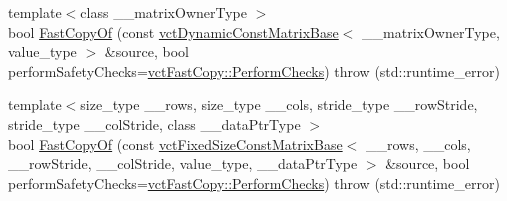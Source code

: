 {\bf }\par
\begin{DoxyCompactItemize}
\item 
{\footnotesize template$<$class \+\_\+\+\_\+matrix\+Owner\+Type $>$ }\\bool \hyperlink{classvct_dynamic_matrix_base_ad8fc2fec875cccff85761db606bd723b}{Fast\+Copy\+Of} (const \hyperlink{classvct_dynamic_const_matrix_base}{vct\+Dynamic\+Const\+Matrix\+Base}$<$ \+\_\+\+\_\+matrix\+Owner\+Type, value\+\_\+type $>$ \&source, bool perform\+Safety\+Checks=\hyperlink{classvct_fast_copy_af2981ae09904d1a4dd9b2d19c86c6cd9}{vct\+Fast\+Copy\+::\+Perform\+Checks})  throw (std\+::runtime\+\_\+error)
\item 
{\footnotesize template$<$size\+\_\+type \+\_\+\+\_\+rows, size\+\_\+type \+\_\+\+\_\+cols, stride\+\_\+type \+\_\+\+\_\+row\+Stride, stride\+\_\+type \+\_\+\+\_\+col\+Stride, class \+\_\+\+\_\+data\+Ptr\+Type $>$ }\\bool \hyperlink{classvct_dynamic_matrix_base_af65803a76f8bc775f088417e3eb83848}{Fast\+Copy\+Of} (const \hyperlink{classvct_fixed_size_const_matrix_base}{vct\+Fixed\+Size\+Const\+Matrix\+Base}$<$ \+\_\+\+\_\+rows, \+\_\+\+\_\+cols, \+\_\+\+\_\+row\+Stride, \+\_\+\+\_\+col\+Stride, value\+\_\+type, \+\_\+\+\_\+data\+Ptr\+Type $>$ \&source, bool perform\+Safety\+Checks=\hyperlink{classvct_fast_copy_af2981ae09904d1a4dd9b2d19c86c6cd9}{vct\+Fast\+Copy\+::\+Perform\+Checks})  throw (std\+::runtime\+\_\+error)
\end{DoxyCompactItemize}

